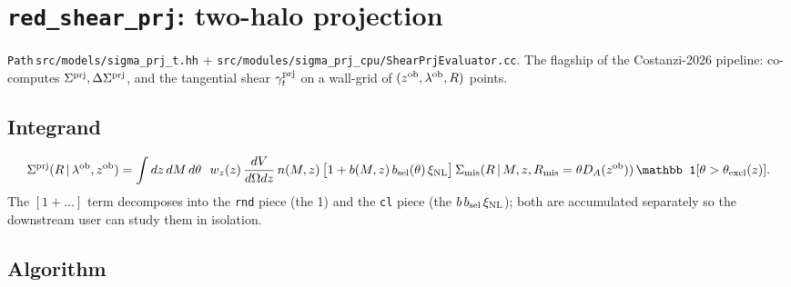 \documentclass[a4paper, 11pt]{article}
\newcommand{\lob}{\lambda^{\rm ob}}
\newcommand{\zob}{z^{\rm ob}}
\newcommand{\xinl}{\xi_{\rm NL}}
\newcommand{\Sprj}{\Sigma^{\rm prj}}
\newcommand{\DSprj}{\Delta\Sigma^{\rm prj}}
\newcommand{\modname}[1]{\textcolor{kwcol}{\texttt{#1}}}
\newcommand{\pyfile}[1]{{\small\texttt{#1}}}
\begin{document}
\section{\texttt{red\_shear\_prj}: two-halo projection}
\label{sec:shear_prj}

\modname{Path}\,\pyfile{src/models/sigma\_prj\_t.hh} +
\pyfile{src/modules/sigma\_prj\_cpu/ShearPrjEvaluator.cc}. The
flagship of the Costanzi-2026 pipeline: co-computes
$\Sprj, \DSprj$, and the tangential shear $\gamma_t^{\rm prj}$ on a
wall-grid of $(\zob, \lob, R)$ points.

\subsection{Integrand}

\begin{equation}
  \Sprj(R \,|\, \lob, \zob)
    = \int dz\, dM\, d\theta\ \
      w_z(z)\, \frac{dV}{d\Omega dz}\, n(M, z)\,
      \big[1 + b(M, z)\, b_{\rm sel}(\theta)\, \xinl\big]\,
      \Sigma_{\rm mis}(R \,|\, M, z, R_{\rm mis} = \theta D_A(\zob))\,
      \mathbb 1[\theta > \theta_{\rm excl}(z)].
\end{equation}
The $[1 + \dots]$ term decomposes into the \texttt{rnd} piece
(the 1) and the \texttt{cl} piece (the $b\,b_{\rm sel}\,\xinl$);
both are accumulated separately so the downstream user can study
them in isolation.

\subsection{Algorithm}
\end{document}
